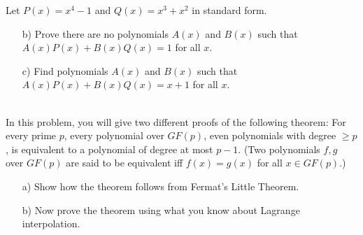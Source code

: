 \documentclass[]{article}
\newif\ifsolutions
\renewcommand{\answer}[1]{{\color{mydarkblue}\textbf{Solution:}#1}}
\begin{document}
\begin{qunlist}
\begin{itemize}
\end{itemize}


Let $P(x) = x^4 - 1$ and $Q(x) = x^3 + x^2$ in standard form.
\begin{itemize}
\qpart
\item[b)] Prove there are no polynomials $A(x)$ and $B(x)$ such that $A(x) P(x) + B(x) Q(x) = 1$ for all $x$.

\ifsolutions{ \answer {
$gcd(P(x), Q(x)) = x+1$
}}\fi


\qpart
\item[c)] Find polynomials $A(x)$ and $B(x)$ such that $A(x) P(x) + B(x) Q(x) = x + 1$ for all $x$. 

\ifsolutions{ \answer {
\[
A(x)=-(x+1) \quad B(x)=x^2
\]
}}\fi

\end{itemize}






 \\   %
In this problem, you will give two different proofs of the following theorem: For every prime $p$, every polynomial over $GF(p)$, even polynomials with degree $\geq p$, is equivalent to a polynomial of degree at most $p-1$. (Two polynomials $f,g$ over $GF(p)$ are said to be equivalent iff $f(x)=g(x)$ for all $x\in GF(p)$.)

\begin{enumerate}
\qpart
\item[a)] Show how the theorem follows from Fermat's Little Theorem. 
\qpart
\item[b)] Now prove the theorem using what you know about Lagrange interpolation.
\end{enumerate}


\ifsolutions{ \answer {
\begin{itemize}
\item[a)]
From Fermat's Little Theorem, we know $\forall x \not\equiv 0, \text{ } x^{p-1} \equiv 1 \pmod{p}$. \\
Multiplying both sides by $x$, and noting that $0^p \equiv 0 \pmod{p}$, we can see that 
\[
\forall x, \text{ } x^p \equiv x \pmod{p}
\]
Therefore, any $x^k$, where $k \geq p$ will be equivalent to $x^n$, where $n \in \{0, 1, \dots, p-1\}$, and will have a degree at most $p - 1$. 

\item[b)]
Since a polynomial $f$ of degree $d$ is described completely by $d + 1$ points, we cannot specify a polynomial of degree $\geq p$ because $f(p) = f(0)$ (and so forth for other values larger than $p$) over $GF(p)$. Thus, we can only specify at most $p$ unique points. Therefore, every polynomial is equivalent to a polynomial of degree at most $p - 1$.
\end{itemize}
}} \fi






\end{qunlist}
\end{document}
